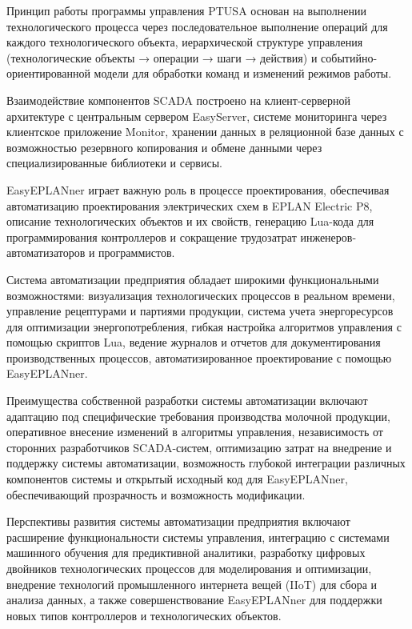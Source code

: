 {	\par \redline Принцип работы программы управления PTUSA основан на выполнении технологического процесса через последовательное выполнение операций для каждого технологического объекта, иерархической структуре управления (технологические объекты → операции → шаги → действия) и событийно-ориентированной модели для обработки команд и изменений режимов работы.
	
	\par \redline Взаимодействие компонентов SCADA построено на клиент-серверной архитектуре с центральным сервером EasyServer, системе мониторинга через клиентское приложение Monitor, хранении данных в реляционной базе данных с возможностью резервного копирования и обмене данными через специализированные библиотеки и сервисы.
	
	\par \redline EasyEPLANner играет важную роль в процессе проектирования, обеспечивая автоматизацию проектирования электрических схем в EPLAN Electric P8, описание технологических объектов и их свойств, генерацию Lua-кода для программирования контроллеров и сокращение трудозатрат инженеров-автоматизаторов и программистов.
	
	\par \redline Система автоматизации предприятия обладает широкими функциональными возможностями: визуализация технологических процессов в реальном времени, управление рецептурами и партиями продукции, система учета энергоресурсов для оптимизации энергопотребления, гибкая настройка алгоритмов управления с помощью скриптов Lua, ведение журналов и отчетов для документирования производственных процессов, автоматизированное проектирование с помощью EasyEPLANner.
	
	\par \redline Преимущества собственной разработки системы автоматизации включают адаптацию под специфические требования производства молочной продукции, оперативное внесение изменений в алгоритмы управления, независимость от сторонних разработчиков SCADA-систем, оптимизацию затрат на внедрение и поддержку системы автоматизации, возможность глубокой интеграции различных компонентов системы и открытый исходный код для EasyEPLANner, обеспечивающий прозрачность и возможность модификации.
	
	\par \redline Перспективы развития системы автоматизации предприятия включают расширение функциональности системы управления, интеграцию с системами машинного обучения для предиктивной аналитики, разработку цифровых двойников технологических процессов для моделирования и оптимизации, внедрение технологий промышленного интернета вещей (IIoT) для сбора и анализа данных, а также совершенствование EasyEPLANner для поддержки новых типов контроллеров и технологических объектов.
	
}

